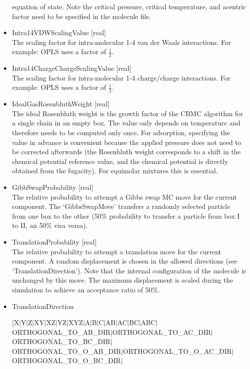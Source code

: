 \begin{itemize}
equation of state. Note the critical pressure, critical temperature, and acentric factor need to be specified in the molecule file.
\item{Intra14VDWScalingValue [real]}\\
The scaling factor for intra-molecular 1-4 van der Waals interactions. For example: OPLS uses a factor of $\frac{1}{2}$.
\item{Intra14ChargeChargeScalingValue [real]}\\
The scaling factor for intra-molecular 1-4 charge/charge interactions. For example: OPLS uses a factor of $\frac{1}{2}$.
\item{IdealGasRosenbluthWeight [real]}\\
The ideal Rosenbluth weight is the growth factor of the CBMC algorithm for a single chain in an empty box. The value only depends on temperature and therefore needs to be computed
only once. For adsorption, specifying the value in advance is convenient because the applied pressure does not need to be corrected afterwards (the Rosenbluth weight corresponds to a shift
in the chemical potential reference value, and the chemical potential is directly obtained from the fugacity). For equimolar mixtures this is essential.
\item{GibbSwapProbability [real]}\\
The relative probability to attempt a Gibbs swap MC move for the current component. The `GibbsSwapMove' transfers a randomly selected particle from one box to the other
(50\% probability to transfer a particle from box I to II, an 50\% visa versa).
\item{TranslationProbability [real]}\\
The relative probability to attempt a translation move for the current component. A random displacement is chosen in the allowed directions (see `TranslationDirection').
Note that the internal configuration of the molecule is unchanged by this move. The maximum displacement is scaled during the simulation to achieve an acceptance
ratio of 50\%.
\item{TranslationDirection 
      \begin{small}
       [X$|$Y$|$Z$|$XY$|$XZ$|$YZ$|$XYZ$|$A$|$B$|$C$|$AB$|$AC$|$BC$|$ABC$|$\\
      \hspace*{2cm}ORTHOGONAL\_TO\_AB\_DIR$|$ORTHOGONAL\_TO\_AC\_DIR$|$ORTHOGONAL\_TO\_BC\_DIR$|$\\
      \hspace*{2cm}ORTHOGONAL\_TO\_O\_AB\_DIR$|$ORTHOGONAL\_TO\_O\_AC\_DIR$|$ORTHOGONAL\_TO\_O\_BC\_DIR$|$\\

\end{small}}
\end{itemize}

